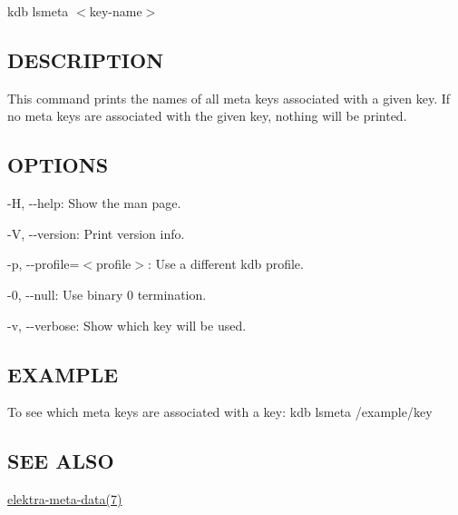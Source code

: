 {\ttfamily kdb lsmeta $<$key-\/name$>$}

\subsection*{D\+E\+S\+C\+R\+I\+P\+T\+I\+O\+N}

This command prints the names of all meta keys associated with a given key. If no meta keys are associated with the given key, nothing will be printed.

\subsection*{O\+P\+T\+I\+O\+N\+S}


\begin{DoxyItemize}
\item {\ttfamily -\/\+H}, {\ttfamily -\/-\/help}\+: Show the man page.
\item {\ttfamily -\/\+V}, {\ttfamily -\/-\/version}\+: Print version info.
\item {\ttfamily -\/p}, {\ttfamily -\/-\/profile}=$<$profile$>$\+: Use a different kdb profile.
\item {\ttfamily -\/0}, {\ttfamily -\/-\/null}\+: Use binary 0 termination.
\item {\ttfamily -\/v}, {\ttfamily -\/-\/verbose}\+: Show which key will be used.
\end{DoxyItemize}

\subsection*{E\+X\+A\+M\+P\+L\+E}

To see which meta keys are associated with a key\+: {\ttfamily kdb lsmeta /example/key}

\subsection*{S\+E\+E A\+L\+S\+O}


\begin{DoxyItemize}
\item \hyperlink{md_doc_help_elektra-meta-data_doc_help_elektra-meta-data_md}{elektra-\/meta-\/data(7)} 
\end{DoxyItemize}